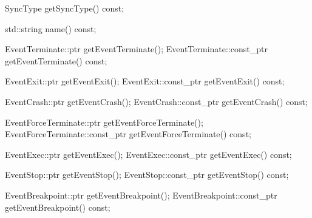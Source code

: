 
\begin{apient}
  SyncType getSyncType() const;
\end{apient}


\begin{apient}
  std::string name() const;
\end{apient}


\begin{apient}
  EventTerminate::ptr getEventTerminate();
  EventTerminate::const_ptr getEventTerminate() const;
\end{apient}

\apidesc{
}

\begin{apient}
  EventExit::ptr getEventExit();
  EventExit::const_ptr getEventExit() const;
\end{apient}

\apidesc{
}

\begin{apient}
  EventCrash::ptr getEventCrash();
  EventCrash::const_ptr getEventCrash() const;
\end{apient}

\apidesc{
}

\begin{apient}
  EventForceTerminate::ptr getEventForceTerminate();
  EventForceTerminate::const_ptr getEventForceTerminate() const;
\end{apient}

\apidesc{
}

\begin{apient}
  EventExec::ptr getEventExec();
  EventExec::const_ptr getEventExec() const;
\end{apient}

\apidesc{
}

\begin{apient}
  EventStop::ptr getEventStop();
  EventStop::const_ptr getEventStop() const;
\end{apient}

\apidesc{
}

\begin{apient}
  EventBreakpoint::ptr getEventBreakpoint();
  EventBreakpoint::const_ptr getEventBreakpoint() const;
\end{apient}

